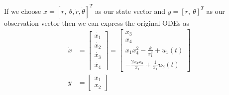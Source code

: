 \documentclass[11pt]{article}
\begin{document}
\subparagraph*{}
If we choose $x = [r,\ \theta, \dot{r}, \dot{\theta}]^T$ as our state vector and $y = [r,\ \theta]^T$ as our observation vector then we can express the original ODEs as
\begin{align*}
	\dot{x} &= \begin{bmatrix} \dot{x_1} \\ \dot{x_2} \\ \dot{x_3} \\ \dot{x_4} \end{bmatrix} 
	= \begin{bmatrix} x_3 \\
				x_4 \\
				x_1x_4^2 - \frac{k}{x_1^2}+u_1(t) \\
				-\frac{2x_4x_3}{x_1} + \frac{1}{x_1}u_2(t)
				\end{bmatrix} \\
	y &= \begin{bmatrix} x_1 \\ x_2 \end{bmatrix}
\end{align*}
\end{document}
